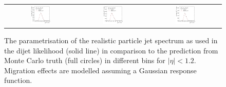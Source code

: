 \begin{figure}[ht]
\begin{tabular}{ccc}
    \includegraphics[width=0.3\textwidth]{figures/ResFit_Spring10QCDFlat_Gauss_Eta0_Spectrum_PtBin10} &
    \includegraphics[width=0.3\textwidth]{figures/ResFit_Spring10QCDFlat_Gauss_Eta0_Spectrum_PtBin11} &
    \includegraphics[width=0.3\textwidth]{figures/ResFit_Spring10QCDFlat_Gauss_Eta0_Spectrum_PtBin12} \\
  \end{tabular}
\caption{The parametrisation of the realistic particle jet \pt spectrum as used in the dijet likelihood (solid line) in comparison to the prediction from Monte Carlo truth (full circles) in different \pt bins for \mbox{$|\eta|<1.2$}. Migration effects are modelled assuming a Gaussian response function.}
\label{fig:ResFit:App:Gauss:Spectrum}
\end{figure}



